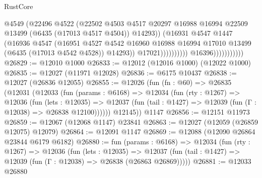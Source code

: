 \begin{lexlean}{RustCore}
\begin{coremodule}
                                            @4549
                                            (@22496
                                              @4522
                                              (@22502
                                                @4503
                                                @4517
                                                @20297
                                                @16988
                                                @16994
                                                @22509
                                                @13499
                                                (@6435 (@17013 @4517 @4504))
                                                @14293))
                                            (@16931
                                              @4547
                                              @1447
                                              (@16936
                                                @4547
                                                (@16951
                                                  @4527
                                                  @4542
                                                  @16960
                                                  @16988
                                                  @16994
                                                  @17010
                                                  @13499
                                                  (@6435 (@17013 @4542 @4528))
                                                  @14293))
                                              @17021))))))))))
                          @16396)))))))))))
@26829 := @12010 @1000
@26833 := @12012 (@12016 @1000) (@12022 @1000)
@26835 := @12027 (@11971 @12028)
@26836 := @6175 @10437
@26838 := @12027 (@26836 @12055)
@26855 := @12026
    (fun (fn : @60) =>
    @26835
      (@12031
        (@12033
          (fun (params : @6168) =>
          @12034
            (fun (rty : @1267) =>
            @12036
              (fun (lets : @12035) =>
              @12037 (fun (tail : @1427) => @12039 (fun (Γ : @12038) => @26838 @12100))))))
        @12145))
    @1147
@26856 := @12151 @11973
@26859 := @12067 (@12068 @1147) @23841
@26863 := @12027 (@12059 (@26859 @12075) @12079)
@26864 := @12091 @1147
@26869 := @12088 (@12090 @26864 @23844 @6179 @6182)
@26880 := fun (params : @6168) =>
  @12034
    (fun (rty : @1267) =>
    @12036
      (fun (lets : @12035) =>
      @12037 (fun (tail : @1427) => @12039 (fun (Γ : @12038) => @26838 (@26863 @26869)))))
@26881 := @12033 @26880

\end{coremodule}
\end{lexlean}

